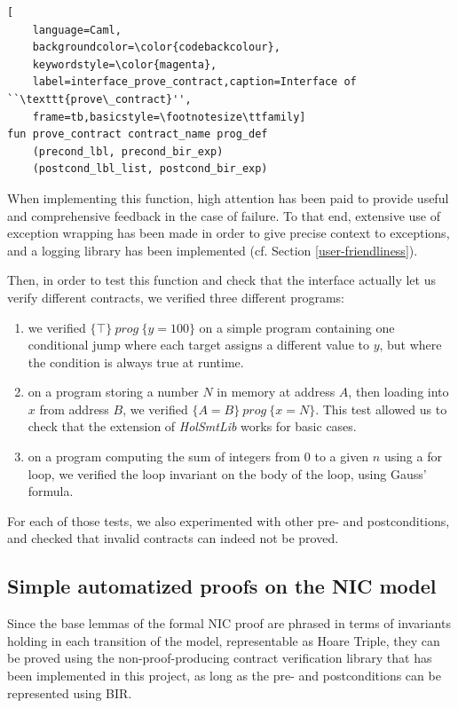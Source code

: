 \documentclass[10pt,a4paper]{article}
\newcommand{\htriple}[3]{\ensuremath{\{#1\}~#2~\{#3\}}}
\begin{document}
\begin{multicols}{2}
\begin{lstlisting}[
    language=Caml,
    backgroundcolor=\color{codebackcolour},
    keywordstyle=\color{magenta},
    label=interface_prove_contract,caption=Interface of ``\texttt{prove\_contract}'',
    frame=tb,basicstyle=\footnotesize\ttfamily]
fun prove_contract contract_name prog_def
    (precond_lbl, precond_bir_exp)
    (postcond_lbl_list, postcond_bir_exp)
\end{lstlisting}

When implementing this function, high attention has been paid to provide useful and comprehensive feedback in the case of failure. To that end, extensive use of exception wrapping has been made in order to give precise context to exceptions, and a logging library has been implemented (cf. Section \ref{user-friendliness}).

Then, in order to test this function and check that the interface actually let us verify different contracts, we verified three different programs:

\begin{enumerate}
  \item we verified \htriple{\top}{prog}{y = 100} on a simple program containing one conditional jump where each target assigns a different value to $y$, but where the condition is always true at runtime.
  \item on a program storing a number $N$ in memory at address $A$, then loading into $x$ from address $B$, we verified \htriple{A=B}{prog}{x=N}. This test allowed us to check that the extension of \textit{HolSmtLib} works for basic cases.
  \item on a program computing the sum of integers from $0$ to a given $n$ using a for loop, we verified the loop invariant on the body of the loop, using Gauss' formula.
\end{enumerate}

For each of those tests, we also experimented with other pre- and postconditions, and checked that invalid contracts can indeed not be proved.

\subsection{Simple automatized proofs on the NIC model} \label{simple-automated-proofs-on-nic}

Since the base lemmas of the formal NIC proof are phrased in terms of invariants holding in each transition of the model, representable as Hoare Triple, they can be proved using the non-proof-producing contract verification library that has been implemented in this project, as long as the pre- and postconditions can be represented using BIR.


\end{multicols}
\end{document}

